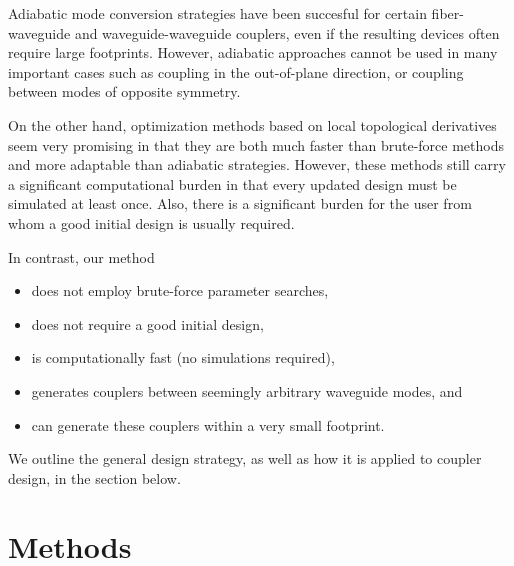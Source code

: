 \documentclass[letterpaper,10pt]{article}
\begin{document}
Adiabatic mode conversion strategies have been succesful
    for certain fiber-waveguide\cite{fwadia} and 
    waveguide-waveguide\cite{wwadia} couplers,
    even if the resulting devices often require large footprints.
However, adiabatic approaches cannot be used in many important cases 
    such as coupling in the out-of-plane direction, or
    coupling between modes of opposite symmetry.

On the other hand, optimization methods based on local topological derivatives 
    seem very promising\cite{deriv}
    in that they are both much faster than brute-force methods and
    more adaptable than adiabatic strategies.
However, these methods still carry a significant computational burden 
    in that every updated design must be simulated at least once.
Also, there is a significant burden for the user from whom
    a good initial design is usually required.


In contrast, our method
\begin{itemize}
    \item does not employ brute-force parameter searches,
    \item does not require a good initial design,
    \item is computationally fast (no simulations required),
    \item generates couplers between seemingly arbitrary waveguide modes, and
    \item can generate these couplers within a very small footprint. 
\end{itemize}
We outline the general design strategy,
    as well as how it is applied to coupler design, in the section below.

\section{Methods}
\end{document}
